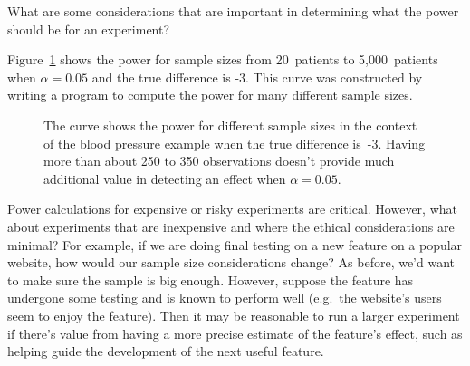 \begin{exercisewrap}
\begin{nexercise}
What are some considerations that are important in determining
what the power should be for an experiment?\footnotemark{}
\end{nexercise}
\end{exercisewrap}

Figure~\ref{power_curve_neg-3} shows the power for sample sizes from 20~patients to 5,000~patients when $\alpha = 0.05$ and the true difference is -3. This curve was constructed by writing a program to compute the power for many different sample sizes.

\begin{figure}[h]
  \centering
  \caption{The curve shows the power for different sample
      sizes in the context of the blood pressure example when
      the true difference is~-3.
      Having more than about 250 to 350 observations doesn't
      provide much additional value in detecting an effect when
      $\alpha = 0.05$.}
  \label{power_curve_neg-3}
\end{figure}

%

Power calculations for expensive or risky experiments are
critical.
However, what about experiments that are inexpensive and
where the ethical considerations are minimal?
For example, if we are doing final testing on a new feature
on a popular website, how would our sample size considerations
change?
As before, we'd want to make sure the sample is big enough.
However, suppose the feature has undergone some testing and
is known to perform well
(e.g.~the website's users seem to enjoy the feature).
Then it may be reasonable to run a larger experiment
if there's value from having a more precise estimate
of the feature's effect, such as helping guide the
development of the next useful feature.




